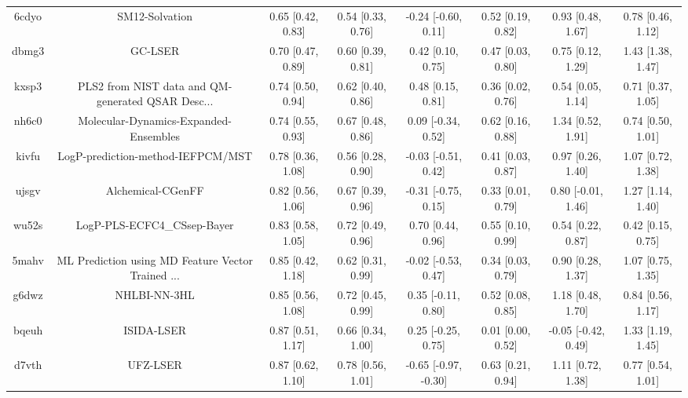 \documentclass{article}
\begin{document}
\begin{center}
\begin{longtable}{|cccccccc|}
 6cdyo &                                     SM12-Solvation &  0.65 [0.42, 0.83] &  0.54 [0.33, 0.76] &   -0.24 [-0.60, 0.11] &  0.52 [0.19, 0.82] &    0.93 [0.48, 1.67] &     0.78 [0.46, 1.12] \\
 dbmg3 &                                            GC-LSER &  0.70 [0.47, 0.89] &  0.60 [0.39, 0.81] &     0.42 [0.10, 0.75] &  0.47 [0.03, 0.80] &    0.75 [0.12, 1.29] &     1.43 [1.38, 1.47] \\
 kxsp3 &  PLS2 from NIST data and QM-generated QSAR Desc... &  0.74 [0.50, 0.94] &  0.62 [0.40, 0.86] &     0.48 [0.15, 0.81] &  0.36 [0.02, 0.76] &    0.54 [0.05, 1.14] &     0.71 [0.37, 1.05] \\
 nh6c0 &              Molecular-Dynamics-Expanded-Ensembles &  0.74 [0.55, 0.93] &  0.67 [0.48, 0.86] &    0.09 [-0.34, 0.52] &  0.62 [0.16, 0.88] &    1.34 [0.52, 1.91] &     0.74 [0.50, 1.01] \\
 kivfu &                  LogP-prediction-method-IEFPCM/MST &  0.78 [0.36, 1.08] &  0.56 [0.28, 0.90] &   -0.03 [-0.51, 0.42] &  0.41 [0.03, 0.87] &    0.97 [0.26, 1.40] &     1.07 [0.72, 1.38] \\
 ujsgv &                                  Alchemical-CGenFF &  0.82 [0.56, 1.06] &  0.67 [0.39, 0.96] &   -0.31 [-0.75, 0.15] &  0.33 [0.01, 0.79] &   0.80 [-0.01, 1.46] &     1.27 [1.14, 1.40] \\
 wu52s &                        LogP-PLS-ECFC4\_CSsep-Bayer &  0.83 [0.58, 1.05] &  0.72 [0.49, 0.96] &     0.70 [0.44, 0.96] &  0.55 [0.10, 0.99] &    0.54 [0.22, 0.87] &     0.42 [0.15, 0.75] \\
 5mahv &  ML Prediction using MD Feature Vector Trained ... &  0.85 [0.42, 1.18] &  0.62 [0.31, 0.99] &   -0.02 [-0.53, 0.47] &  0.34 [0.03, 0.79] &    0.90 [0.28, 1.37] &     1.07 [0.75, 1.35] \\
 g6dwz &                                       NHLBI-NN-3HL &  0.85 [0.56, 1.08] &  0.72 [0.45, 0.99] &    0.35 [-0.11, 0.80] &  0.52 [0.08, 0.85] &    1.18 [0.48, 1.70] &     0.84 [0.56, 1.17] \\
 bqeuh &                                         ISIDA-LSER &  0.87 [0.51, 1.17] &  0.66 [0.34, 1.00] &    0.25 [-0.25, 0.75] &  0.01 [0.00, 0.52] &  -0.05 [-0.42, 0.49] &     1.33 [1.19, 1.45] \\
 d7vth &                                           UFZ-LSER &  0.87 [0.62, 1.10] &  0.78 [0.56, 1.01] &  -0.65 [-0.97, -0.30] &  0.63 [0.21, 0.94] &    1.11 [0.72, 1.38] &     0.77 [0.54, 1.01] \\

\end{longtable}
\end{center}
\end{document}
